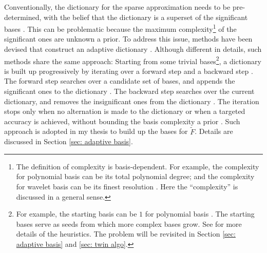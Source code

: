 Conventionally, the dictionary for the sparse approximation needs to
be pre-determined, with the belief that the dictionary is a superset of the significant bases
\cite{adaptive basis 2}. 
This can be problematic because 
the maximum complexity\footnote{
The definition of complexity is basis-dependent. For example, the complexity for
polynomial basis can be its total polynomial degree; and the complexity for
wavelet basis can be its finest resolution \cite{wavelet mallat}. Here the ``complexity'' is
discussed in a general sense. } 
of the significant ones are unknown a prior.
To address this issue, methods have been devised that construct an adaptive dictionary
\cite{adaptive basis 1, adaptive basis 2, adaptive basis 3}.
Although different in details, such methods share the same approach: Starting from some trivial
bases\footnote{
For example, the starting basis can be $1$ for polynomial basis \cite{adaptive basis 1}.
The starting bases serve as seeds from which more complex bases grow. See \cite{adaptive basis 1,
adaptive basis 2, adaptive basis 3} for more details of the heuristics. The problem will be 
revisited in Section \ref{sec: adaptive basis} and \ref{sec: twin algo}.}, 
a dictionary is built up progressively 
by iterating over a forward step and a backward step
\cite{adaptive basis 1, adaptive basis 2, adaptive basis 3}.
The forward step searches over a candidate set of bases, and appends the significant ones 
to the dictionary
\cite{adaptive basis 1, adaptive basis 2, adaptive basis 3}.
The backward step searches over the current dictionary, and removes the 
insignificant ones from the dictionary
\cite{adaptive basis 1, adaptive basis 2, adaptive basis 3}.
The iteration stops only when no alternation is made to the dictionary or when a targeted 
accuracy is achieved, without bounding the basis complexity a prior
\cite{adaptive basis 1, adaptive basis 2, adaptive basis 3}.
Such approach is adopted in my thesis to build up 
the bases for $\tilde{F}$. Details are discussed in Section \ref{sec: adaptive basis}.\\





